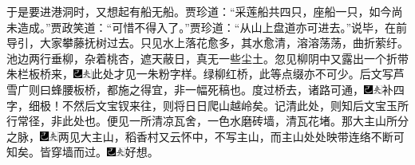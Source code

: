 于是要进港洞时，又想起有船无船。贾珍道：“采莲船共四只，座船一只，如今尚未造成。”贾政笑道：“可惜不得入了。”贾珍道：“从山上盘道亦可进去。”说毕，在前导引，大家攀藤抚树过去。只见水上落花愈多，其水愈清，溶溶荡荡，曲折萦纡。池边两行垂柳，杂着桃杏，遮天蔽日，真无一些尘土。忽见柳阴中又露出一个折带朱栏板桥来，{\includegraphics[width=3mm]{../Images/00003}\includegraphics[width=3mm]{../Images/00012}\footnotesize \kaishu 此处才见一朱粉字样。绿柳红桥，此等点缀亦不可少。后文写芦雪广则曰蜂腰板桥，都施之得宜，非一幅死稿也。}度过桥去，诸路可通，{\includegraphics[width=3mm]{../Images/00003}\includegraphics[width=3mm]{../Images/00012}\footnotesize \kaishu 补四字，细极！不然后文宝钗来往，则将日日爬山越岭矣。记清此处，则知后文宝玉所行常径，非此处也。}便见一所清凉瓦舍，一色水磨砖墙，清瓦花堵。那大主山所分之脉，{\includegraphics[width=3mm]{../Images/00003}\includegraphics[width=3mm]{../Images/00012}\footnotesize \kaishu 两见大主山，稻香村又云怀中，不写主山，而主山处处映带连络不断可知矣。}皆穿墙而过。{\includegraphics[width=3mm]{../Images/00003}\includegraphics[width=3mm]{../Images/00012}\footnotesize \kaishu 好想。}

